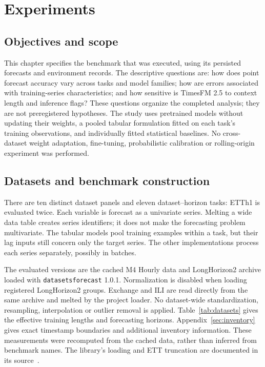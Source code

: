 \clearpage
\section{Experiments}\label{sec:experiments}

\subsection{Objectives and scope}
This chapter specifies the benchmark that was executed, using its persisted forecasts and environment records. The descriptive questions are: how does point forecast accuracy vary across tasks and model families; how are errors associated with training-series characteristics; and how sensitive is TimesFM 2.5 to context length and inference flags? These questions organize the completed analysis; they are not preregistered hypotheses. The study uses pretrained models without updating their weights, a pooled tabular formulation fitted on each task's training observations, and individually fitted statistical baselines. No cross-dataset weight adaptation, fine-tuning, probabilistic calibration or rolling-origin experiment was performed.

\subsection{Datasets and benchmark construction}\label{sec:datasets}
There are ten distinct dataset panels and eleven dataset--horizon tasks: ETTh1 is evaluated twice. Each variable is forecast as a univariate series. Melting a wide data table creates series identifiers; it does not make the forecasting problem multivariate. The tabular models pool training examples within a task, but their lag inputs still concern only the target series. The other implementations process each series separately, possibly in batches.

The evaluated versions are the cached M4 Hourly data and LongHorizon2 archive loaded with \texttt{datasetsforecast} 1.0.1. Normalization is disabled when loading registered LongHorizon2 groups. Exchange and ILI are read directly from the same archive and melted by the project loader. No dataset-wide standardization, resampling, interpolation or outlier removal is applied. Table~\ref{tab:datasets} gives the effective training lengths and forecasting horizons. Appendix~\ref{sec:inventory} gives exact timestamp boundaries and additional inventory information. These measurements were recomputed from the cached data, rather than inferred from benchmark names. The library's loading and ETT truncation are documented in its source~\cite{datasetsforecast_lh2}.

